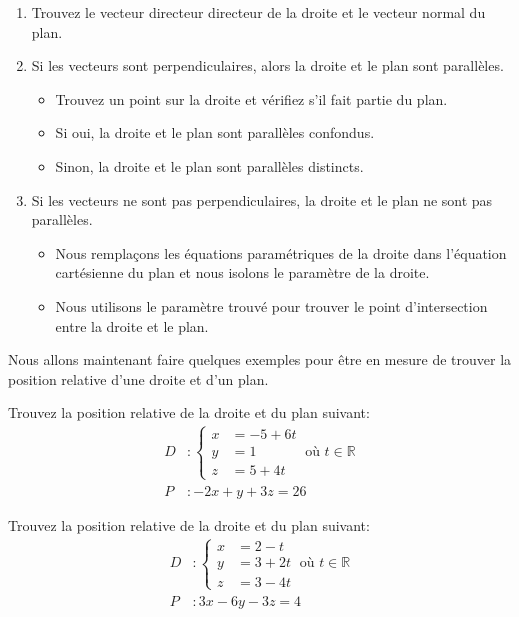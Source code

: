 \documentclass[]{book}
\providecommand{\tightlist}{%
  \setlength{\itemsep}{0pt}\setlength{\parskip}{0pt}}
\theoremstyle{definition}
\theoremstyle{definition}
\theoremstyle{definition}
\theoremstyle{remark}
\let\BeginKnitrBlock\begin \let\EndKnitrBlock\end
\begin{document}
\begin{enumerate}
\def\labelenumi{\arabic{enumi}.}
\item
  Trouvez le vecteur directeur directeur de la droite et le vecteur normal du plan.
\item
  Si les vecteurs sont perpendiculaires, alors la droite et le plan sont parallèles.

  \begin{itemize}
  \tightlist
  \item
    Trouvez un point sur la droite et vérifiez s'il fait partie du plan.
  \item
    Si oui, la droite et le plan sont parallèles confondus.
  \item
    Sinon, la droite et le plan sont parallèles distincts.
  \end{itemize}
\item
  Si les vecteurs ne sont pas perpendiculaires, la droite et le plan ne sont pas parallèles.

  \begin{itemize}
  \tightlist
  \item
    Nous remplaçons les équations paramétriques de la droite dans l'équation cartésienne du plan et nous isolons le paramètre de la droite.
  \item
    Nous utilisons le paramètre trouvé pour trouver le point d'intersection entre la droite et le plan.
  \end{itemize}
\end{enumerate}

Nous allons maintenant faire quelques exemples pour être en mesure de trouver la position relative d'une droite et d'un plan.

\BeginKnitrBlock{example}
\protect\hypertarget{exm:unnamed-chunk-229}{}{\label{exm:unnamed-chunk-229} }Trouvez la position relative de la droite et du plan suivant:
\begin{align*}
D &: \begin{cases}
x &= -5+6t \\
y &= 1 \\
z &= 5+4t
\end{cases}
\ \text{où } t\in\mathbb{R} \\
P &: -2x+y+3z = 26
\end{align*}
\EndKnitrBlock{example}

\BeginKnitrBlock{example}
\protect\hypertarget{exm:droite-plan-secants}{}{\label{exm:droite-plan-secants} }Trouvez la position relative de la droite et du plan suivant:
\begin{align*}
D &: \begin{cases}
x &= 2-t \\
y &= 3+2t \\
z &= 3-4t
\end{cases}
\ \text{où } t\in\mathbb{R} \\
P &: 3x-6y-3z = 4
\end{align*}
\EndKnitrBlock{example}
\end{document}
